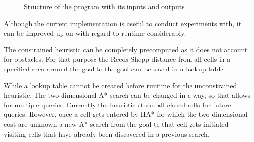 \begin{figure}[h]
    \caption{Structure of the program with its inputs and outputs}
    \label{fig:programStructure}
\end{figure}

Although the current implementation is useful to conduct experiments with, it can be improved up on with regard to runtime considerably.

The constrained heuristic can be completely precomputed as it does not account for obstacles. For that purpose the Reeds Shepp distance from all cells in a specified area around the goal to the goal can be saved in a lookup table.

While a lookup table cannot be created before runtime for the unconstrained heuristic. The two dimensional A* search can be changed in a way, so that allows for multiple queries. Currently the heuristic stores all closed cells for future queries. However, once a cell gets entered by HA* for which the two dimensional cost are unknown a new A* search from the goal to that cell gets initiated visiting cells that have already been discovered in a previous search.


